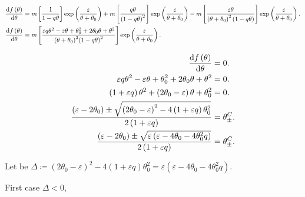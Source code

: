 \documentclass[
    8pt,
    aspectratio=1610,
    c,
    intlimits,
    leqno,
    professionalfonts,
]{beamer}
\begin{document}
\begin{frame}
	\begin{align*}
		\diff{f\left(\theta\right)}{\theta} & =
		m\left[\frac{1}{1-q\theta}\right]
		\exp\left(\frac{\varepsilon}{\theta+\theta_{0}}\right)+
		m\left[\frac{q\theta}{\left(1-q\theta\right)^{2}}\right]
		\exp\left(\frac{\varepsilon}{\theta+\theta_{0}}\right)-
		m\left[\frac{\varepsilon\theta}{{\left(\theta+\theta_{0}\right)}^{2}\left(1-q\theta\right)}\right]
		\exp\left(\frac{\varepsilon}{\theta+\theta_{0}}\right). \\
		\diff{f\left(\theta\right)}{\theta} & =
		m\left[
			\frac{
				\varepsilon q\theta^{2}-
				\varepsilon\theta+
				\theta_{0}^{2}+
				2\theta_{0}\theta+
				\theta^{2}
			}{
				{\left(\theta+\theta_{0}\right)}^{2}
					{\left(1-q\theta\right)}^{2}
			}
			\right]
		\exp\left(\frac{\varepsilon}{\theta+\theta_{0}}\right).
	\end{align*}

	\begin{align*}
		\diff{f\left(\theta\right)}{\theta} & =
		0.                                      \\
		\varepsilon q\theta^{2}-
		\varepsilon\theta+
		\theta_{0}^{2}+
		2\theta_{0}\theta+
		\theta^{2}                          & =
		0.                                      \\
		\left(1+\varepsilon q\right)
		\theta^{2}+
		\left(2\theta_{0}-\varepsilon\right)\theta+
		\theta_{0}^{2}                      & =
		0.                                      \\
		\frac{
			\left(\varepsilon-2\theta_{0}\right)\pm
			\sqrt{{\left(2\theta_{0}-\varepsilon\right)}^{2}-4\left(1+\varepsilon q\right)\theta_{0}^{2}}
		}{
			2\left(1+\varepsilon q\right)
		}
		                                    & =
		\theta^{C}_{\pm}.                       \\
		\frac{
			\left(\varepsilon-2\theta_{0}\right)\pm
			\sqrt{\varepsilon\left(\varepsilon-4\theta_{0}-4\theta_{0}^{2}q\right)}
		}{
			2\left(1+\varepsilon q\right)
		}
		                                    & =
		\theta^{C}_{\pm}.
	\end{align*}

	Let be $\Delta\coloneqq {\left(2\theta_{0}-\varepsilon\right)}^{2}-4\left(1+\varepsilon q\right)\theta_{0}^{2}=\varepsilon\left(\varepsilon-4\theta_{0}-4\theta_{0}^{2}q\right)$.

	\begin{description}
		\item[First case $\Delta<0$,]


\end{description}
\end{frame}
\end{document}
